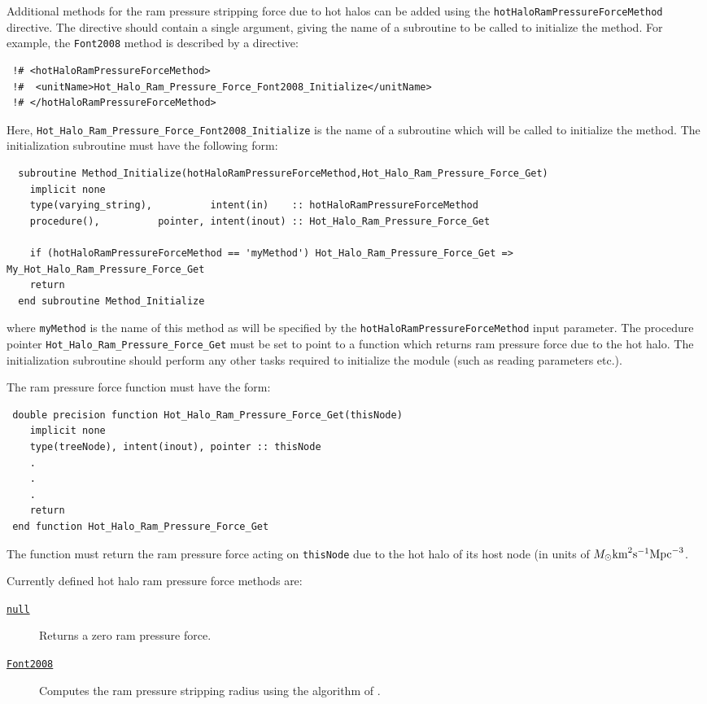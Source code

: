 Additional methods for the ram pressure stripping force due to hot halos can be added using the {\tt hotHaloRamPressureForceMethod} directive. The directive should contain a single argument, giving the name of a subroutine to be called to initialize the method. For example, the {\tt Font2008} method is described by a directive:
\begin{verbatim}
 !# <hotHaloRamPressureForceMethod>
 !#  <unitName>Hot_Halo_Ram_Pressure_Force_Font2008_Initialize</unitName>
 !# </hotHaloRamPressureForceMethod>
\end{verbatim}
Here, {\tt Hot\_Halo\_Ram\_Pressure\_Force\_Font2008\_Initialize} is the name of a subroutine which will be called to initialize the method. The initialization subroutine must have the following form:
\begin{verbatim}
  subroutine Method_Initialize(hotHaloRamPressureForceMethod,Hot_Halo_Ram_Pressure_Force_Get)
    implicit none
    type(varying_string),          intent(in)    :: hotHaloRamPressureForceMethod
    procedure(),          pointer, intent(inout) :: Hot_Halo_Ram_Pressure_Force_Get
    
    if (hotHaloRamPressureForceMethod == 'myMethod') Hot_Halo_Ram_Pressure_Force_Get => My_Hot_Halo_Ram_Pressure_Force_Get
    return
  end subroutine Method_Initialize
\end{verbatim}
where {\tt myMethod} is the name of this method as will be specified by the {\tt hotHaloRamPressureForceMethod} input parameter. The procedure pointer {\tt Hot\_Halo\_Ram\_Pressure\_Force\_Get} must be set to point to a function which returns ram pressure force due to the hot halo. The initialization subroutine should perform any other tasks required to initialize the module (such as reading parameters etc.).

The ram pressure force function must have the form:
\begin{verbatim}
 double precision function Hot_Halo_Ram_Pressure_Force_Get(thisNode)
    implicit none
    type(treeNode), intent(inout), pointer :: thisNode
    .
    .
    .
    return
 end function Hot_Halo_Ram_Pressure_Force_Get
\end{verbatim}
The function must return the ram pressure force acting on {\tt thisNode} due to the hot halo of its host node (in units of $M_\odot \hbox{km}^2 \hbox{s}^{-1} \hbox{Mpc}^{-3}$.

Currently defined hot halo ram pressure force methods are:
\begin{description}
 \item [\hyperlink{hot_halo.ram_pressure_force.null.F90:hot_halo_ram_pressure_force_null:hot_halo_ram_pressure_force_null_get}{{\tt null}}] Returns a zero ram pressure force.
 \item [\hyperlink{hot_halo.ram_pressure_force.Font2008.F90:hot_halo_ram_pressure_force_font2008:hot_halo_ram_pressure_force_font2008_get}{{\tt Font2008}}] Computes the ram pressure stripping radius using the algorithm of \cite{font_colours_2008}.
\end{description}

